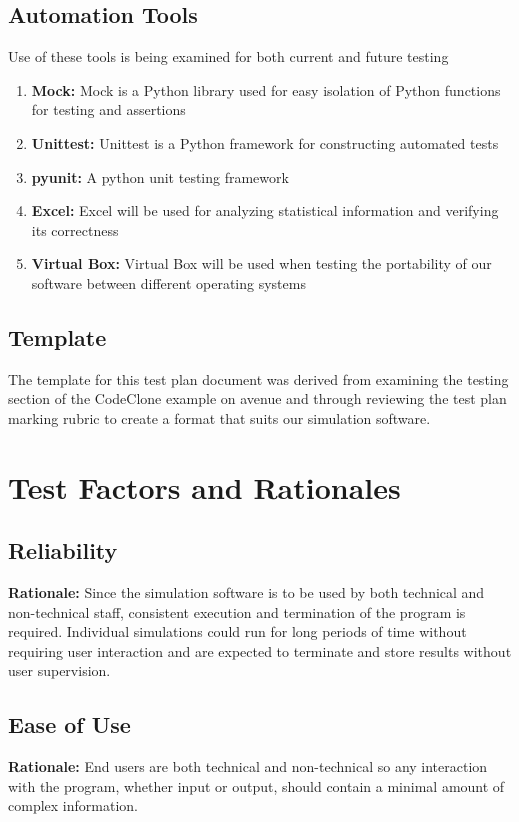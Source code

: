 \documentclass[paper=letter, fontsize=10pt]{scrartcl}
\numberwithin{equation}{section}		%
\numberwithin{figure}{section}			%
\numberwithin{table}{section}				%
\begin{document}
\subsection{Automation Tools}
Use of these tools is being examined for both current and future testing
\begin{enumerate}
	\item \textbf{Mock:} Mock is a Python library used for easy isolation of Python functions for testing and assertions
	\item \textbf{Unittest:} Unittest is a Python framework for constructing automated tests
	\item \textbf{pyunit:} A python unit testing framework
	\item \textbf{Excel:} Excel will be used for analyzing statistical information and verifying its correctness
	\item \textbf{Virtual Box:} Virtual Box will be used when testing the portability of our software between different operating systems
\end{enumerate}
\subsection{Template}
The template for this test plan document was derived from examining the testing section of the CodeClone example on avenue and through reviewing the test plan marking rubric to create a format that suits our simulation software.

\section{Test Factors and Rationales}
\subsection{Reliability}
\textbf{Rationale:} Since the simulation software is to be used by both technical and non-technical staff, consistent execution and termination of the program is required. Individual simulations could run for long periods of time without requiring user interaction and are expected to terminate and store results without user supervision.
\subsection{Ease of Use}
\textbf{Rationale:} End users are both technical and non-technical so any interaction with the program, whether input or output, should contain a minimal amount of complex information.  
\end{document}
